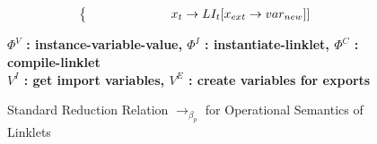 \begin{figure}[!htbp]
{\begin{minipage}{0.93\textwidth}
\begin{align*}
\begin{cases*}
          \;        &\; \hspace{1.6cm} $x_t\rightarrow LI_t[x_{ext}\rightarrow var_{new}]]$
        \end{cases*}
      \end{align*}
    \end{minipage}%
  }
  \vspace{0.3em}
  \begin{center}
    \textbf{
      $\Phi^V$ : instance-variable-value, \quad
      $\Phi^I$ : instantiate-linklet, \quad
      $\Phi^C$ : compile-linklet\\
      $V^I$ : get import variables, \quad
      $V^E$ : create variables for exports
    }
  \end{center}
  \caption{Standard Reduction Relation $\longrightarrow_{\beta_p}$ for Operational Semantics of Linklets}
  \label{fig:linklets-reduction-relation}
\end{figure}



